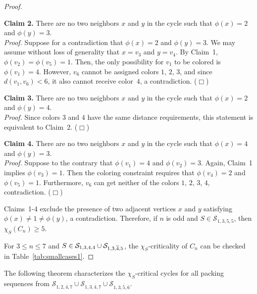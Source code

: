 \documentclass[12pt]{article}
\newcommand{\smallqed}{{\tiny ($\Box$)}}
\newcommand{\cS}{{\cal S}}
\begin{document}
\begin{proof}
\begin{itemize}
  

    \textbf{Claim 2.} There are no two neighbors $x$ and $y$ in the cycle such that $\phi(x)=2$ and $\phi(y)=3$.\\
   \noindent \textit{Proof.}
Suppose for a contradiction that $\phi(x)=2$ and $\phi(y)= 3$. We may assume without loss of generality that $x= v_3$ and $y=v_4$. By Claim~1, $\phi(v_2)=\phi(v_5)=1$. Then, the only possibility for $v_1$ to be colored is $\phi(v_1)=4$. However, $v_6$ cannot be assigned colors $1$, $2$, $3$, and since $d(v_1, v_6) <6$, it also cannot receive color~$4$, a contradiction. \smallqed

\textbf{Claim 3.} There are no two neighbors $x$ and $y$ in the cycle such that $\phi(x)=2$ and $\phi(y)= 4$.\\
   \noindent \textit{Proof.}
 Since colors $3$ and $4$ have the same distance requirements, this statement is equivalent to Claim~2.  \smallqed


\textbf{Claim 4.} There are no two neighbors $x$ and $y$ in the cycle such that $\phi(x)=4$ and $\phi(y)= 3$.\\
   \noindent \textit{Proof.}
Suppose to the contrary that $\phi(v_1)=4$ and $\phi(v_2)= 3$. Again, Claim~1 implies $\phi(v_3)=1$. Then the coloring constraint requires that $\phi(v_4)=2$ and $\phi(v_5)=1$. Furthermore, $v_6$ can get neither of the colors $1$, $2$, $3$, $4$, contradiction. \smallqed

Claims~1-4 exclude the presence of two adjacent vertices $x$ and $y$ satisfying $\phi(x) \neq 1 \neq \phi(y)$,  a contradiction.
Therefore, if $n$ is odd and  $S \in \mathcal{S}_{1,3,5,5}$, then $\chi_S(C_n) \ge 5$. 
\end{itemize}


 For $3 \leq n \leq 7$ and $S \in \mathcal{S}_{1,3,4,4} \cup \cS_{1,3,\overline{4},5}$, the $\chi_S$-criticality of $C_n$ can be checked in Table~\ref{tab:smallcases1}.
\end{proof}

The following theorem characterizes the $\chi_S$-critical cycles for all packing sequences 
from $\mathcal{S}_{1,2,\overline{4},7} \cup \mathcal{S}_{1,3,\overline{4},7} \cup \mathcal{S}_{1,3,\overline{5},6}$.
\end{document}
